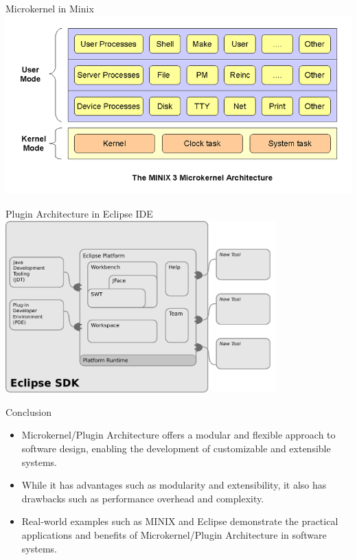 \documentclass[aspectratio=169, table]{beamer}
\begin{document}
	\begin{frame}{Microkernel in Minix}
		\vspace{20pt}
		\centering
		\includegraphics[width=\textwidth]{../../images/microkernel2}
	\end{frame}	
	
	\begin{frame}{Plugin Architecture in Eclipse IDE}
		\vspace{10pt}
		\centering
		\includegraphics[width=0.78\textwidth]{../../images/plugin1}
	\end{frame}	
	
	\begin{frame}{Conclusion}
		\begin{itemize}
			\item Microkernel/Plugin Architecture offers a modular and flexible approach to software design, enabling the development of customizable and extensible systems.
			\item While it has advantages such as modularity and extensibility, it also has drawbacks such as performance overhead and complexity.
			\item Real-world examples such as MINIX and Eclipse demonstrate the practical applications and benefits of Microkernel/Plugin Architecture in software systems.
		\end{itemize}
	\end{frame}
	
\end{document}
